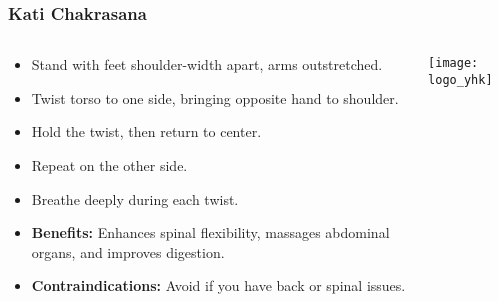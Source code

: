 \begin{frame}[fragile]\frametitle{Kati Chakrasana}
\begin{columns}
    \begin{column}[T]{0.5\linewidth}
      \begin{itemize}
        \item Stand with feet shoulder-width apart, arms outstretched.
        \item Twist torso to one side, bringing opposite hand to shoulder.
        \item Hold the twist, then return to center.
        \item Repeat on the other side.
        \item Breathe deeply during each twist.
        \item \textbf{Benefits:} Enhances spinal flexibility, massages abdominal organs, and improves digestion.
        \item \textbf{Contraindications:} Avoid if you have back or spinal issues.
      \end{itemize}
    \end{column}
    \begin{column}[T]{0.5\linewidth}
        \begin{center}
        \texttt{[image: logo\_yhk]}
        \end{center}    
    \end{column}
  \end{columns}
\end{frame}

